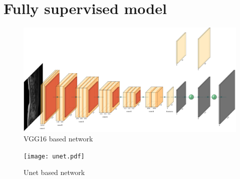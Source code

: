 \section{Fully supervised model}







\begin{figure}
    \centering
    \includegraphics[width=.95\textwidth]{vgg16_upscore.pdf}
    \caption{VGG16 based network}
\end{figure}

\begin{figure}
    \centering
    \texttt{[image: unet.pdf]}
    \caption{Unet based network}
\end{figure}

